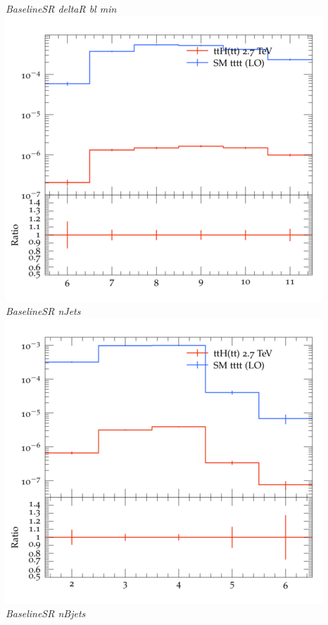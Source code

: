 \documentclass{beamer}
\begin{document}
\begin{frame}
\begin{columns}
\textit{\small BaselineSR deltaR bl min}
\includegraphics[width=\textwidth]{../plots/ttH_2700/tttt_ttH_1LOS/BaselineSR_nJets.png}\\
\textit{\small BaselineSR nJets}
\includegraphics[width=\textwidth]{../plots/ttH_2700/tttt_ttH_1LOS/BaselineSR_nBjets.png}\\
\textit{\small BaselineSR nBjets}
\end{columns}
\end{frame}
\end{document}
